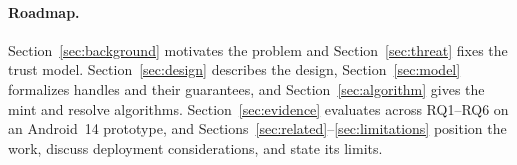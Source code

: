 \paragraph{Roadmap.} Section~\ref{sec:background} motivates the problem and Section~\ref{sec:threat} fixes the trust model. Section~\ref{sec:design} describes the design, Section~\ref{sec:model} formalizes handles and their guarantees, and Section~\ref{sec:algorithm} gives the mint and resolve algorithms. Section~\ref{sec:evidence} evaluates \SH{} across RQ1--RQ6 on an Android~14 prototype, and Sections~\ref{sec:related}--\ref{sec:limitations} position the work, discuss deployment considerations, and state its limits.
